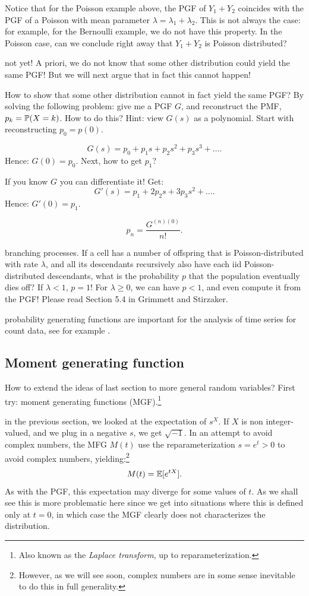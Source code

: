 \documentclass{article}
\begin{document}
 Notice that for the Poisson example above, the PGF of $Y_1 + Y_2$ coincides with the PGF of a Poisson with mean parameter $\lambda = \lambda_1+\lambda_2$. This is not always the case: for example, for the Bernoulli example, we do not have this property. In the Poisson case, can we conclude right away that $Y_1 + Y_2$ is Poisson distributed? 

 not yet! A priori, we do not know that some other distribution could yield the same PGF! But we will next argue that in fact this cannot happen!

 How to show that some other distribution cannot in fact yield the same PGF? By solving the following problem: give me a PGF $G$, and reconstruct the PMF, $p_k = \P(X = k)$. How to do this? Hint: view $G(s)$ as a polynomial. Start with reconstructing $p_0 = p(0)$.

 \[ G(s) = p_0 + p_1 s + p_2 s^2 + p_3 s^3 + \dots. \]
Hence: $G(0) = p_0$. Next, how to get $p_1$?

 If you know $G$ you can differentiate it! Get:
\[ G'(s) = p_1 + 2 p_2 s + 3 p_3 s^2 + \dots. \]
Hence: $G'(0) = p_1$.

 \[ p_n = \frac{G^{(n)(0)}}{n!}. \]

 branching processes. If a cell has a number of offspring that is Poisson-distributed with rate $\lambda$, and all its descendants recursively also have each iid Poisson-distributed descendants, what is the probability $p$ that the population eventually dies off? If $\lambda < 1$, $p=1$! For $\lambda \ge 0$, we can have $p < 1$, and even compute it from the PGF! Please read Section 5.4 in Grimmett and Stirzaker. 

  probability generating functions are important for the analysis of time series for count data, see for example \cite{zhu_negative_2010}.


\subsection{Moment generating function}

How to extend the ideas of last section to more general random variables? First try: moment generating functions (MGF).\footnote{Also known as the \emph{Laplace transform}, up to reparameterization.}

 in the previous section, we looked at the expectation of $s^X$. If $X$ is non integer-valued, and we plug in a negative $s$, we get $\sqrt{-1}$. In an attempt to avoid complex numbers, the MFG $M(t)$ use the reparameterization $s = e^t > 0$ to avoid complex numbers, yielding:\footnote{However, as we will see soon, complex numbers are in some sense inevitable to do this in full generality.}
\[ M(t) = \E[e^{tX}]. \]
As with the PGF, this expectation may diverge for some values of $t$. As we shall see this is more problematic here since we get into situations where this is defined only at $t=0$, in which case the MGF clearly does not characterizes the distribution.
\end{document}
